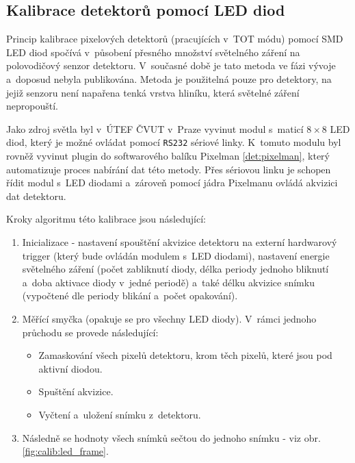 \subsection{Kalibrace detektorů pomocí LED diod}\label{calib:led}
Princip kalibrace pixelových detektorů (pracujících v~TOT módu) pomocí SMD LED diod spočívá v~působení přesného množství světelného záření na polovodičový senzor detektoru. V~současné době je tato metoda ve fázi vývoje a~doposud nebyla publikována. Metoda je použitelná pouze pro detektory, na jejiž senzoru není napařena tenká vrstva hliníku, která světelné záření nepropouští. 

Jako zdroj světla byl v~ÚTEF ČVUT v~Praze vyvinut modul s~maticí $8\times8$ LED diod, který je možné ovládat pomocí \texttt{RS232} sériové linky. K~tomuto modulu byl rovněž vyvinut plugin do softwarového balíku Pixelman \ref{det:pixelman}, který automatizuje proces nabírání dat této metody. Přes sériovou linku je schopen řídit modul s~LED diodami a~zároveň pomocí jádra Pixelmanu ovládá akvizici dat detektoru.

Kroky algoritmu této kalibrace jsou následující:
\begin{enumerate}
	\item Inicializace - nastavení spouštění akvizice detektoru na externí hardwarový trigger (který bude ovládán modulem s~LED diodami), nastavení energie světelného záření (počet zabliknutí diody, délka periody jednoho bliknutí a~doba aktivace diody v~jedné periodě) a~také délku akvizice snímku (vypočtené dle periody blikání a~počet opakování).
	\item Měřící smyčka (opakuje se pro všechny LED diody). V~rámci jednoho průchodu se provede následující:
		\begin{itemize}
			\item Zamaskování všech pixelů detektoru, krom těch pixelů, které jsou pod aktivní diodou.
			\item Spuštění akvizice.
			\item Vyčtení a~uložení snímku z~detektoru.
		\end{itemize}
	\item Následně se hodnoty všech snímků sečtou do jednoho snímku - viz obr. \ref{fig:calib:led_frame}.
\end{enumerate}

